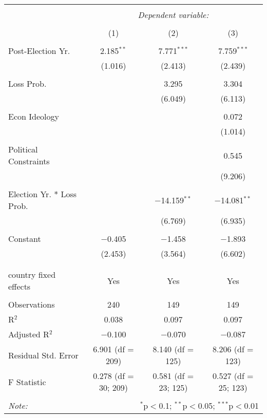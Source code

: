 
\begingroup 
\footnotesize 
\begin{tabular}{@{\extracolsep{5pt}}lccc} 
\\[-1.8ex]\hline 
\hline \\[-1.8ex] 
 & \multicolumn{3}{c}{\textit{Dependent variable:}} \\ 
\cline{2-4} 
\\[-1.8ex] & (1) & (2) & (3)\\ 
\hline \\[-1.8ex] 
 Post-Election Yr. & 2.185$^{**}$ & 7.771$^{***}$ & 7.759$^{***}$ \\ 
  & (1.016) & (2.413) & (2.439) \\ 
  & & & \\ 
 Loss Prob. &  & 3.295 & 3.304 \\ 
  &  & (6.049) & (6.113) \\ 
  & & & \\ 
 Econ Ideology &  &  & 0.072 \\ 
  &  &  & (1.014) \\ 
  & & & \\ 
 Political Constraints &  &  & 0.545 \\ 
  &  &  & (9.206) \\ 
  & & & \\ 
 Election Yr. * Loss Prob. &  & $-$14.159$^{**}$ & $-$14.081$^{**}$ \\ 
  &  & (6.769) & (6.935) \\ 
  & & & \\ 
 Constant & $-$0.405 & $-$1.458 & $-$1.893 \\ 
  & (2.453) & (3.564) & (6.602) \\ 
  & & & \\ 
\hline \\[-1.8ex] 
country fixed effects & Yes & Yes & Yes \\ 
\hline \\[-1.8ex] 
Observations & 240 & 149 & 149 \\ 
R$^{2}$ & 0.038 & 0.097 & 0.097 \\ 
Adjusted R$^{2}$ & $-$0.100 & $-$0.070 & $-$0.087 \\ 
Residual Std. Error & 6.901 (df = 209) & 8.140 (df = 125) & 8.206 (df = 123) \\ 
F Statistic & 0.278 (df = 30; 209) & 0.581 (df = 23; 125) & 0.527 (df = 25; 123) \\ 
\hline 
\hline \\[-1.8ex] 
\textit{Note:}  & \multicolumn{3}{r}{$^{*}$p$<$0.1; $^{**}$p$<$0.05; $^{***}$p$<$0.01} \\ 
\end{tabular} 
\endgroup 
